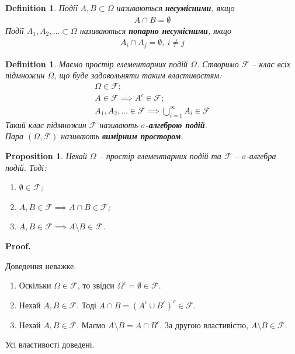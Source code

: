 \documentclass[a4paper, 10pt]{article}
\makeatletter
\theoremstyle{theoremdd}
\newtheorem{definition}[theorem]{Definition}
\newtheorem{proposition}[theorem]{Proposition}
\renewenvironment{proof}[1][Proof.\\]{\par
\pushQED{\hfill \qed}%
\normalfont \topsep6\p@\@plus6\p@\relax
\trivlist
\item\relax
{\bfseries
#1\@addpunct{.}}\hspace\labelsep\ignorespaces
}{%
\popQED\endtrivlist\@endpefalse
}
\makeatother
\begin{document}
\begin{definition}
Події $A,B \subset \Omega$ називаються \textbf{несумісними}, якщо
\begin{align*}
A \cap B = \emptyset
\end{align*}
Події $A_1,A_2,\dots \subset \Omega$ називаються \textbf{попарно несумісними}, якщо
\begin{align*}
A_i \cap A_j = \emptyset,\ i \neq j
\end{align*}
\end{definition}

\begin{definition}
Маємо простір елементарних подій $\Omega$. Створимо $\mathcal{F}$ -- клас всіх підмножин $\Omega$, що буде задовольняти таким властивостям:
\begin{align*}
\Omega \in \mathcal{F}; \\
A \in \mathcal{F} \implies A^c \in \mathcal{F}; \\
A_1,A_2,\dots \in \mathcal{F} \implies \bigcup_{i=1}^\infty A_i \in \mathcal{F}
\end{align*}
Такий клас підмножин $\mathcal{F}$ називають \textbf{$\sigma$-алгеброю подій}.\\
Пара $(\Omega, \mathcal{F})$ називають \textbf{вимірним простором}.
\end{definition}

\begin{proposition}
Нехай $\Omega$ -- простір елементарних подій та $\mathcal{F}$ -- $\sigma$-алгебра подій. Тоді:
\begin{enumerate}[nosep,wide=0pt,label={\arabic*)}]
\item $\emptyset \in \mathcal{F}$;
\item $A,B \in \mathcal{F} \implies A \cap B \in \mathcal{F}$;
\item $A,B \in \mathcal{F} \implies A \setminus B \in \mathcal{F}$.
\end{enumerate}
\end{proposition}

\begin{proof}
Доведення неважке.
\begin{enumerate}[nosep,wide=0pt,label={\arabic*)}]
\item Оскільки $\Omega \in \mathcal{F}$, то звідси $\Omega^c = \emptyset \in \mathcal{F}$.
\item Нехай $A,B \in \mathcal{F}$. Тоді $A \cap B = (A^c \cup B^c)^c \in \mathcal{F}$.
\item Нехай $A,B \in \mathcal{F}$. Маємо $A \setminus B = A \cap B^c$. За другою властивістю, $A \setminus B \in \mathcal{F}$. 
\end{enumerate}
Усі властивості доведені.
\end{proof}
\end{document}
